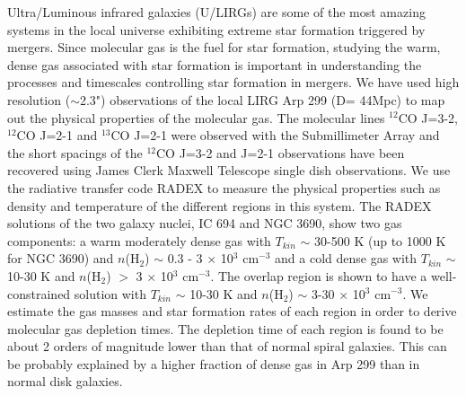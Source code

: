 Ultra/Luminous infrared galaxies (U/LIRGs) are some of the most amazing systems in the local universe exhibiting extreme star formation triggered by mergers. Since molecular gas is the fuel for star formation, studying the warm, dense gas associated with star formation is important in understanding the processes and timescales controlling star formation in mergers. We have used high resolution ($\sim$2.3") observations of the local LIRG Arp 299 (D= 44Mpc) to map out the physical properties of the molecular gas. The molecular lines $^{12}$CO J=3-2, $^{12}$CO J=2-1 and $^{13}$CO J=2-1 were observed with the Submillimeter Array and the short spacings of the $^{12}$CO J=3-2 and J=2-1 observations have been recovered using James Clerk Maxwell Telescope single dish observations. We use the radiative transfer code RADEX to measure the physical properties such as density and temperature of the different regions in this system. The RADEX solutions of the two galaxy nuclei, IC 694 and NGC 3690, show two gas components: a warm  moderately dense gas with $T_{kin}$ $\sim$ 30-500 K (up to 1000 K for NGC 3690) and $n$(H$_{2}$) $\sim$ 0.3 - 3 $\times$ 10$^{3}$ cm$^{-3}$ and a cold dense gas with $T_{kin}$ $\sim$ 10-30 K and $n$(H$_{2}$) $>$ 3 $\times$ 10$^{3}$ cm$^{-3}$. The overlap region is shown to have a well-constrained solution with $T_{kin}$ $\sim$ 10-30 K and $n$(H$_{2}$) $\sim$ 3-30 $\times$ 10$^{3}$ cm$^{-3}$. We estimate the gas masses and star formation rates of each region in order to derive molecular gas depletion times. The depletion time of each region is found to be about 2 orders of magnitude lower than that of normal spiral galaxies. This can be probably explained by a higher fraction of dense gas in Arp 299 than in normal disk galaxies. 
